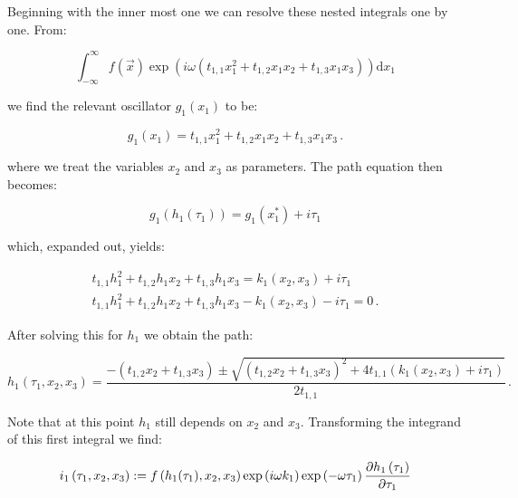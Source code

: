 \documentclass[a4paper,10pt]{article}
\begin{document}
Beginning with the inner most one we can resolve these nested
integrals one by one. From:

\begin{equation}
 \int_{-\infty}^{\infty} f\left(\vec{x}\right)
   \exp\left(i \omega \left(t_{1,1} x_1^2 + t_{1,2} x_1 x_2 + t_{1,3} x_1 x_3\right) \right)
 \mathrm{d}x_1
\end{equation}

we find the relevant oscillator $g_1(x_1)$ to be:

\begin{equation}
  g_1\left(x_1\right) = t_{1,1} x_1^2 + t_{1,2} x_1 x_2 + t_{1,3} x_1 x_3 \,.
\end{equation}

where we treat the variables $x_2$ and $x_3$ as parameters.
The path equation then becomes:

\begin{equation}
  g_1\left(h_1(\tau_1)\right) = g_1\left(x_1^{*}\right) + i \tau_1
\end{equation}


which, expanded out, yields:

\begin{gather}
  t_{1,1} h_1^2 + t_{1,2} h_1 x_2 + t_{1,3} h_1 x_3 = k_1(x_2, x_3) + i \tau_1 \\
  t_{1,1} h_1^2 + t_{1,2} h_1 x_2 + t_{1,3} h_1 x_3 - k_1(x_2, x_3) - i \tau_1 = 0 \,.
\end{gather}

After solving this for $h_1$ we obtain the path:

\begin{equation}
  h_1\left(\tau_1, x_2, x_3\right) =
  \frac{-\left(t_{1,2} x_2 + t_{1,3} x_3\right)
        \pm \sqrt{
                  \left(t_{1,2} x_2 + t_{1,3} x_3\right)^2 + 4 t_{1,1} \left(k_1(x_2,x_3)+i \tau_1\right)
                  }
        }{2 t_{1,1}} \,.
\end{equation}

Note that at this point $h_1$ still depends on $x_2$ and $x_3$. Transforming
the integrand of this first integral we find:

\begin{equation}
 i_1\left(\tau_1, x_2, x_3\right) := f\left(h_1(\tau_1), x_2, x_3\right) \exp\left(i \omega k_1 \right)
                                     \exp\left(- \omega \tau_1 \right) \frac{\partial h_1\left(\tau_1\right)}{\partial \tau_1}
\end{equation}
\end{document}
